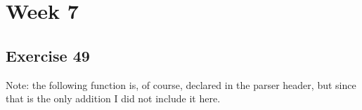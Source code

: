 



\section*{Week 7}
\subsection*{Exercise 49}
Note: the following function is, of course, declared in the parser header, but since that is the only addition I did not include it here.

\newpage



